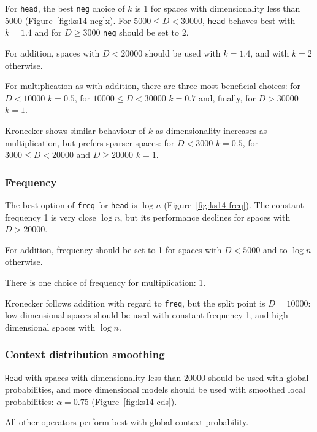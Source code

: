 
For \texttt{head}, the best \texttt{neg} choice of $k$ is 1 for spaces with dimensionality less than 5000 (Figure~\ref{fig:ks14-neg}x). For $5000 \leq D < 30000$, \texttt{head} behaves best with $k = 1.4$ and for $D \geq 3000$ \texttt{neg} should be set to 2.

For addition, spaces with $D < 20000$ should be used with $k = 1.4$, and with $k = 2$ otherwise.

For multiplication as with addition, there are three most beneficial choices: for $D < 10000$ $k = 0.5$, for $10000 \leq D < 30000$ $k = 0.7$ and, finally, for $D > 30000$ $k = 1$.

Kronecker shows similar behaviour of $k$ as dimensionality increases as multiplication, but prefers sparser spaces: for $D < 3000$ $k = 0.5$, for $3000 \leq D < 20000$ and $D \geq 20000$ $k = 1$.

\subsubsection{Frequency}
The best option of \texttt{freq} for \texttt{head} is $\log n$ (Figure~\ref{fig:ks14-freq}). The constant frequency 1 is very close $\log n$, but its performance declines for spaces with $D > 20000$.

For addition, frequency should be set to 1 for spaces with $D < 5000$ and to $\log n$ otherwise.

There is one choice of frequency for multiplication: 1.

Kronecker follows addition with regard to \texttt{freq}, but the split point is $D = 10000$: low dimensional spaces should be used with constant frequency 1, and high dimensional spaces with $\log n$.

\subsubsection{Context distribution smoothing}


\texttt{Head} with spaces with dimensionality less than 20000 should be used with global probabilities, and more dimensional models should be used with smoothed local probabilities: $\alpha = 0.75$ (Figure~\ref{fig:ks14-cds}).

All other operators perform best with global context probability.

